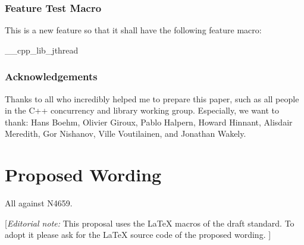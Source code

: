\subsubsection*{Feature Test Macro}

This is a new feature so that it shall have the following feature macro:
\begin{codeblock}
	__cpp_lib_jthread
\end{codeblock}


\subsubsection*{Acknowledgements}

Thanks to all who incredibly helped me to prepare this paper, such as all people in the C++ concurrency and library working group.
Especially, we want to thank: Hans Boehm, Olivier Giroux, Pablo Halpern, Howard Hinnant, Alisdair Meredith, Gor Nishanov, Ville Voutilainen, and Jonathan Wakely.


\section*{Proposed Wording}
All against N4659.

{\color{blue}
[{\itshape{}Editorial note:} This proposal uses the LaTeX macros of the draft standard.
        To adopt it please ask for the LaTeX source code of the proposed wording. ]
}

\clearpage

